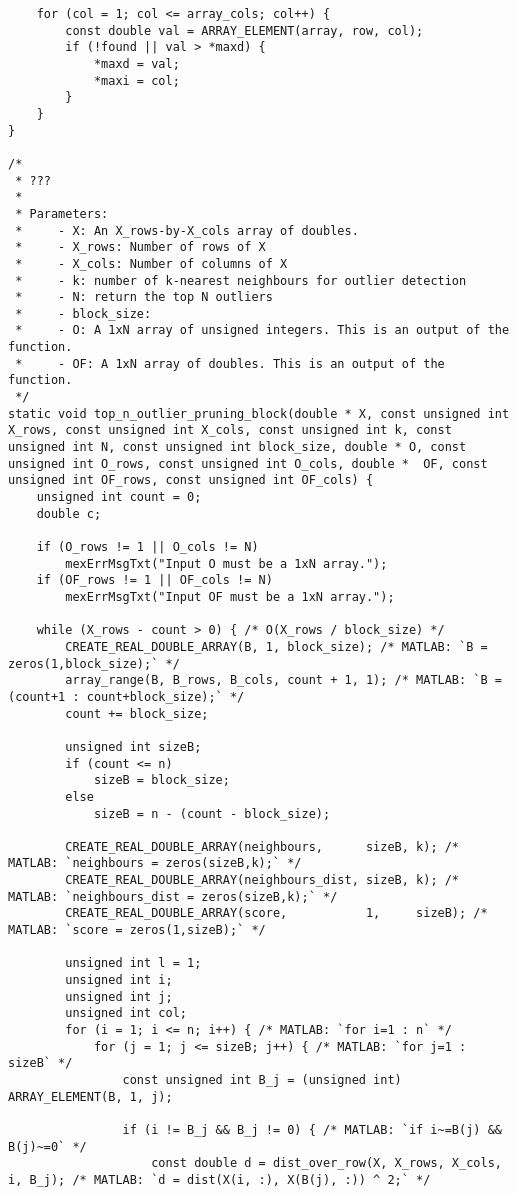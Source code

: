 \begin{lstlisting}
    for (col = 1; col <= array_cols; col++) {
        const double val = ARRAY_ELEMENT(array, row, col);
        if (!found || val > *maxd) {
            *maxd = val;
            *maxi = col;
        }
    }
}

/*
 * ???
 *
 * Parameters:
 *     - X: An X_rows-by-X_cols array of doubles.
 *     - X_rows: Number of rows of X
 *     - X_cols: Number of columns of X
 *     - k: number of k-nearest neighbours for outlier detection
 *     - N: return the top N outliers
 *     - block_size:
 *     - O: A 1xN array of unsigned integers. This is an output of the function.
 *     - OF: A 1xN array of doubles. This is an output of the function.
 */
static void top_n_outlier_pruning_block(double * X, const unsigned int X_rows, const unsigned int X_cols, const unsigned int k, const unsigned int N, const unsigned int block_size, double * O, const unsigned int O_rows, const unsigned int O_cols, double *  OF, const unsigned int OF_rows, const unsigned int OF_cols) {
	unsigned int count = 0;
	double c;
    
    if (O_rows != 1 || O_cols != N)
    	mexErrMsgTxt("Input O must be a 1xN array.");
    if (OF_rows != 1 || OF_cols != N)
    	mexErrMsgTxt("Input OF must be a 1xN array.");

    while (X_rows - count > 0) { /* O(X_rows / block_size) */
        CREATE_REAL_DOUBLE_ARRAY(B, 1, block_size); /* MATLAB: `B = zeros(1,block_size);` */
        array_range(B, B_rows, B_cols, count + 1, 1); /* MATLAB: `B = (count+1 : count+block_size);` */
        count += block_size;

        unsigned int sizeB;
        if (count <= n)
            sizeB = block_size;
        else
            sizeB = n - (count - block_size);

        CREATE_REAL_DOUBLE_ARRAY(neighbours,      sizeB, k); /* MATLAB: `neighbours = zeros(sizeB,k);` */
        CREATE_REAL_DOUBLE_ARRAY(neighbours_dist, sizeB, k); /* MATLAB: `neighbours_dist = zeros(sizeB,k);` */
        CREATE_REAL_DOUBLE_ARRAY(score,           1,     sizeB); /* MATLAB: `score = zeros(1,sizeB);` */

        unsigned int l = 1;
        unsigned int i;
        unsigned int j;
        unsigned int col;
        for (i = 1; i <= n; i++) { /* MATLAB: `for i=1 : n` */
            for (j = 1; j <= sizeB; j++) { /* MATLAB: `for j=1 : sizeB` */
                const unsigned int B_j = (unsigned int) ARRAY_ELEMENT(B, 1, j);

                if (i != B_j && B_j != 0) { /* MATLAB: `if i~=B(j) && B(j)~=0` */
                    const double d = dist_over_row(X, X_rows, X_cols, i, B_j); /* MATLAB: `d = dist(X(i, :), X(B(j), :)) ^ 2;` */


\end{lstlisting}
